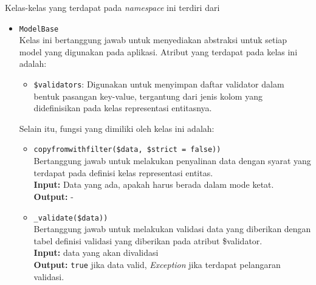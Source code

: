     Kelas-kelas yang terdapat pada \textit{namespace} ini terdiri dari
    \begin{itemize}
        \item \texttt{ModelBase} \\
            Kelas ini bertanggung jawab untuk menyediakan abstraksi untuk setiap
            model yang digunakan pada aplikasi. Atribut yang terdapat pada kelas
            ini adalah:
            \begin{itemize}
                \item \texttt{\$validators}: Digunakan untuk menyimpan daftar
                    validator dalam bentuk pasangan key-value, tergantung dari
                    jenis kolom yang didefinisikan pada kelas representasi
                    entitasnya.
            \end{itemize}
            Selain itu, fungsi yang dimiliki oleh kelas ini adalah:
            \begin{itemize}
                \item \texttt{copyfromwithfilter(\$data, \$strict = false))}\\
                    Bertanggung jawab untuk melakukan penyalinan data dengan
                    syarat yang terdapat pada definisi kelas representasi
                    entitas.\\
                    \textbf{Input:} Data yang ada, apakah harus berada dalam
                    mode ketat.\\
                    \textbf{Output:} -
                    
                \item \texttt{\_validate(\$data))}\\
                    Bertanggung jawab untuk melakukan validasi data yang
                    diberikan dengan tabel definisi validasi yang diberikan pada
                    atribut \$validator.\\
                    \textbf{Input:} data yang akan divalidasi\\
                    \textbf{Output:} \texttt{true} jika data valid,
                        \textit{Exception} jika terdapat pelangaran validasi.
            \end{itemize}
            

\end{itemize}
